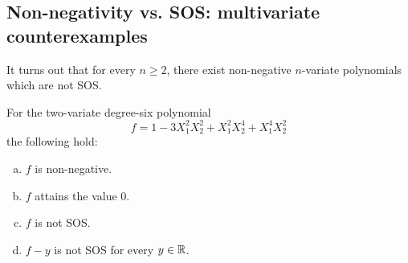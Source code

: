 \subsection{Non-negativity vs. SOS: multivariate counterexamples} 

It turns out that for every $n \ge 2$, there exist non-negative $n$-variate polynomials which are not SOS. 

\goodbreak
\begin{proposition}
	\label{motzkin}
	For the two-variate degree-six polynomial 
	\[
		f = 1 -3 X_1^2 X_2^2 + X_1^2 X_2^4 + X_1^4 X_2^2
	\]
	the following hold:
	\begin{enumerate}[(a)]
		\item $f$ is non-negative.
		\item $f$ attains the value $0$.
		\item $f$ is not SOS. 
		\item $f-y$ is not SOS for every $y \in \mathbb{R}$. 
	\end{enumerate}
\end{proposition}

